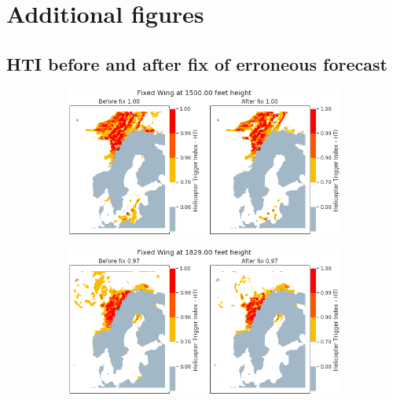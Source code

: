 \appendix
\chapter{Additional figures}
\label{A1}

\section{HTI before and after fix of erroneous forecast}
\begin{figure}[H]
    \begin{subfigure}{0.45\textwidth}
    \centering
    \includegraphics[width=\textwidth]{Figures/03.png}
    \caption{}
    \label{fig:HTI03}
    \end{subfigure}
    \hfill
    \begin{subfigure}{0.45\textwidth}
    \centering
    \includegraphics[width=\textwidth]{Figures/08.png}
    \caption{}
    \label{fig:HTI08}
    \end{subfigure}


\end{figure}

